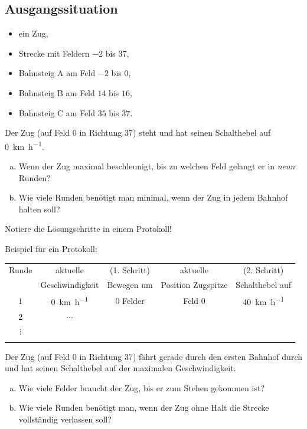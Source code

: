 \documentclass[
    nexus,      %
    10pt,        %
    oneside,
    draft=true,
    green,
]{tubsbook} %
\begin{document}
    \subsection*{Ausgangssituation}
    \begin{itemize}
      \item ein Zug,
      \item Strecke mit Feldern $-2$ bis $37$,
      \item Bahnsteig A am Feld $-2$ bis $0$,
      \item Bahnsteig B am Feld $14$ bis $16$,
      \item Bahnsteig C am Feld $35$ bis $37$.
    \end{itemize}
    \aufgabe
    Der Zug (auf Feld $0$ in Richtung $37$) steht und hat seinen Schalthebel auf \SI{0}{\kilo\metre\per\hour}.
    \begin{enumerate}[a)]
      \item Wenn der Zug maximal beschleunigt, bis zu welchen Feld gelangt er in \emph{neun} Runden?
      \item Wie viele Runden benötigt man minimal, wenn der Zug in jedem Bahnhof halten soll?
    \end{enumerate}
    Notiere die Lösungschritte in einem Protokoll!
    \begin{center}
      Beispiel für ein Protokoll:\\
      \begin{tabular}{cccc|c}
        \toprule
        Runde   & aktuelle                    & (1. Schritt)& aktuelle          & (2. Schritt)                  \\
                & Geschwindigkeit             & Bewegen um  & Position Zugspitze& Schalthebel auf               \\
        \hline
        $1$     & \SI{0}{\kilo\metre\per\hour}& $0$ Felder  & Feld $0$          & \SI{40}{\kilo\metre\per\hour} \\
        \hline
        $2$     & $\cdots$                    &             &                   &                               \\
        \hline
        $\vdots$&                             &             &                   &                               \\
        \hline 
                &                             &             &                   &                               \\
        \bottomrule
      \end{tabular}
    \end{center}
    \aufgabe
    Der Zug (auf Feld $0$ in Richtung $37$) fährt gerade durch den ersten Bahnhof durch und hat seinen Schalthebel auf der maximalen Geschwindigkeit. 
    \begin{enumerate}[a)]
      \item Wie viele Felder braucht der Zug, bis er zum Stehen gekommen ist?
      \item Wie viele Runden benötigt man, wenn der Zug ohne Halt die Strecke vollständig verlassen soll?
    \end{enumerate}
\end{document}
